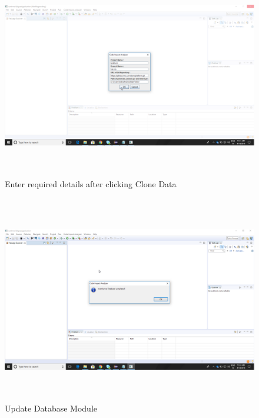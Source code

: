 \documentclass[oneside,a4paper,12pt]{book}
\begin{document}
\begin{figure}[H]
	\begin{Center}
		\includegraphics[width=5.75in,height=3.57in,scale=1.5]{dlRyGVSm3k.png}
		\caption{Enter required details after clicking Clone Data}
		\label{fig:Input Console}
	\end{Center}
\end{figure}

\begin{figure}[H]
	\begin{Center}
		\includegraphics[width=5.75in,height=3.57in,scale=1.5]{ADxabx4JTb.png}
		\caption{Update Database Module}
		\label{fig:Update Database Module}
	\end{Center}
\end{figure}
\end{document}
